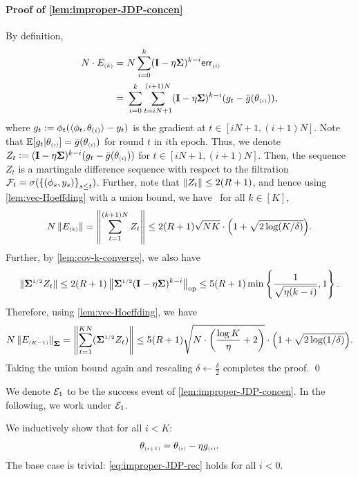 \paragraph{Proof of \cref{lem:improper-JDP-concen}}
By definition,
\begin{align*}
    N\cdot E_{\scriptscriptstyle{ (k) }}=&~N\sum_{i=0}^{k} (\mathbf{I}-\eta\boldsymbol{\Sigma})^{k-i}\mathsf{err}_{\scriptscriptstyle{ (i) }} \\
    =&~ \sum_{i=0}^{k}\sum_{t=iN+1}^{(i+1)N} (\mathbf{I}-\eta\boldsymbol{\Sigma})^{k-i}(g_t-\Bar{g}(\theta_{\scriptscriptstyle{ (i) }})),
\end{align*}
where $g_t:=\phi_t(\langle \phi_t,\theta_{(i)}\rangle-y_t)$ is the gradient at $t \in [iN+1, (i+1)N]$. Note that $\mathbb{E}[g_t|\theta_{\scriptscriptstyle{ (i) }}]=\Bar{g}(\theta_{\scriptscriptstyle{ (i) }})$ for round $t$ in $i$th epoch. Thus, we denote $Z_t\mathrel{\mathop:}= (\mathbf{I}-\eta\boldsymbol{\Sigma})^{k-i}(g_t-\Bar{g}(\theta_{\scriptscriptstyle{ (i) }}))$ for $t\in[iN+1,(i+1)N]$. Then, the sequence $Z_t$ is a martingale difference sequence with respect to the filtration $\mathcal{F}_t=\sigma(\left\{(\phi_s,y_s)\right\}_{s\leq t})$.
Further, note that $\left\|Z_t\right\|\leq 2(R+1)$, and hence using \cref{lem:vec-Hoeffding} with a union bound, we have \whp~for all $k\in[K]$,
\begin{align*}
    N\left\|E_{\scriptscriptstyle{ (k) }}\right\|=\left\|\sum_{t=1}^{(k+1)N} Z_t\right\|\leq 2(R+1)\sqrt{NK}\cdot {\left( 1+\sqrt{2\log(K/\delta)} \right)}.
\end{align*}
Further, by \cref{lem:cov-k-converge}, we also have
\begin{align*}
    \left\|\boldsymbol{\Sigma}^{{\scriptscriptstyle1/2}} Z_t\right\|\leq 2(R+1)\left\|\boldsymbol{\Sigma}^{{\scriptscriptstyle1/2}}(\mathbf{I}-\eta\boldsymbol{\Sigma})^{k-i}\right\|_{\rm op}\leq 5(R+1)\min\left\{\frac{1}{\sqrt{\eta(k-i)}},1\right\}.
\end{align*}
Therefore, using \cref{lem:vec-Hoeffding}, we have \whp
\begin{align*}
    N\left\|E_{\scriptscriptstyle{ (K-1) }}\right\|_{\boldsymbol{\Sigma}}=\left\|\sum_{t=1}^{KN} (\boldsymbol{\Sigma}^{{\scriptscriptstyle1/2}} Z_t)\right\|\leq 5(R+1)\sqrt{N\cdot {\left( \frac{\log K}{\eta}+2 \right)}}\cdot {\left( 1+\sqrt{2\log(1/\delta)} \right)}.
\end{align*}
Taking the union bound again and rescaling $\delta\leftarrow \frac{\delta}{2}$ completes the proof.
\qed


We denote $\mathcal{E}_1$ to be the success event of \cref{lem:improper-JDP-concen}. 
In the following, we work under $\mathcal{E}_1$.

We inductively show that for all $i<K$:
\begin{align}\label{eq:improper-JDP-rec}
    \theta_{\scriptscriptstyle{ (i+1) }}=\theta_{\scriptscriptstyle{ (i) }}-\eta g_{\scriptscriptstyle{ (i) }}.
\end{align}
The base case is trivial: \eqref{eq:improper-JDP-rec} holds for all $i<0$. 

